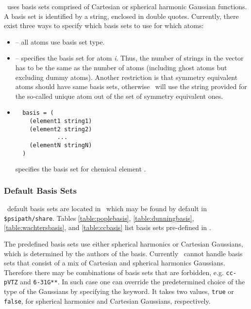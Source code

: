 \PSIthree\ uses basis sets comprised of Cartesian or spherical harmonic
Gaussian functions. A basis set is identified by a string, enclosed
in double quotes. Currently, there exist three ways to specify which
basis sets to use for which atoms:
\begin{itemize}
\item {} -- all atoms use basis set type.
\item {} -- 
specifies the basis set for atom {\em i}. Thus, the number of strings
in the  vector has to be the same as the number of
atoms (including ghost atoms but excluding dummy atoms). Another
restriction is that symmetry equivalent atoms should have same basis
sets, otherwise \PSIinput\ will use the string provided for the
so-called unique atom out of the set of symmetry equivalent ones.
\item 
\begin{verbatim}
  basis = (
    (element1 string1)
    (element2 string2)
            ...
    (elementN stringN)
  )
\end{verbatim}
 specifies the basis set for chemical element 
.
\end{itemize}

\subsubsection{Default Basis Sets}

\PSIthree\ default basis sets are located in \pbasisdat\ which may be
found by default in {\tt \$psipath/share}. Tables
\ref{table:poplebasis}, \ref{table:dunningbasis},
\ref{table:wachtersbasis}, and \ref{table:ccbasis} list basis sets
pre-defined in \pbasisdat.

The predefined basis sets use either spherical harmonics or Cartesian
Gaussians, which is determined by the authors of the basis.
Currently \PSIthree\ cannot handle basis sets that consist
of a mix of Cartesian and spherical harmonics Gaussians.
Therefore there may be combinations of basis sets that are forbidden,
e.g. {\tt cc-pVTZ} and {\tt 6-31G**}.
In such case one can override the predetermined choice
of the type of the Gaussians by specifying the 
keyword. It takes two values, {\tt true} or {\tt false},
for spherical harmonics and Cartesian Gaussians, respectively.

